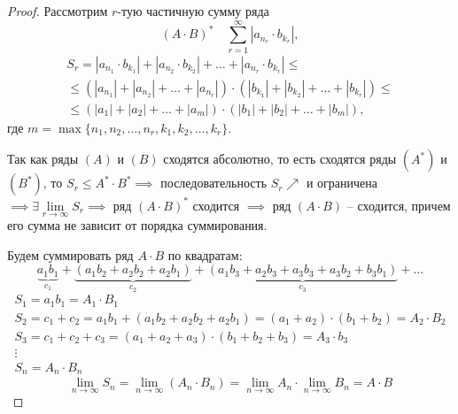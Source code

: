 \begin{proof}
    Рассмотрим $r$-тую частичную сумму ряда
    \[
        (A\cdot B)^* \quad \sum_{r=1}^{\infty}|a_{n_r}\cdot b_{k_r}|,
    \]
    \begin{multline*}
        S_r = |a_{n_1} \cdot b_{k_1}| + |a_{n_2} \cdot b_{k_2}| + \ldots + |a_{n_r} \cdot b_{k_r}| \leqslant \\
        \leqslant (|a_{n_1}| + |a_{n_2}| + \ldots + |a_{n_r}|) \cdot (|b_{k_1}| + |b_{k_2}| + \ldots + |b_{k_r}|) \leqslant \\
        \leqslant (|a_1| + |a_2| + \ldots + |a_m|) \cdot (|b_1| + |b_2| + \ldots + |b_m|),
    \end{multline*}
    где $m = \max\{n_1,n_2,\ldots,n_r,k_1,k_2,\ldots,k_r\}$.

    Так как ряды $(A)$ и $(B)$ сходятся абсолютно, то есть сходятся ряды $(A^*)$ и $(B^*)$, то $S_r \leqslant A^* \cdot B^* \implies$ последовательность $S_r \nearrow$ и ограничена $\implies \exists \underset{r\rightarrow\infty}{\lim} S_r \implies$ ряд $(A\cdot B)^*$ сходится $\implies$ ряд $ (A\cdot B) $ -- сходится, причем его сумма не зависит от порядка суммирования.

    Будем суммировать ряд $A\cdot B$ по квадратам:
    \[
        \underbrace{a_1b_1}_{c_1} + \underbrace{(a_1b_2 + a_2 b_2 + a_2 b_1)}_{c_2} + \underbrace{(a_1b_3 + a_2b_3 + a_3b_3 + a_3b_2 + b_3b_1)}_{c_3} + \ldots
    \]
    \[
        \begin{array}{l}
            S_1 = a_1b_1 = A_1\cdot B_1                                                                        \\
            S_2 = c_1 + c_2 = a_1b_1 + (a_1b_2 + a_2b_2 + a_2b_1) = (a_1 + a_2)\cdot(b_1 + b_2) = A_2\cdot B_2 \\
            S_3 = c_1 + c_2 + c_3 = (a_1 + a_2 + a_3)\cdot(b_1 + b_2 + b_3) = A_3\cdot b_3                     \\
            \vdots                                                                                             \\
            S_n = A_n \cdot B_n
        \end{array}
    \]
    \[
        \underset{n\rightarrow\infty}{\lim}S_n = \underset{n\rightarrow\infty}{\lim}(A_n \cdot B_n) = \underset{n\rightarrow\infty}{\lim}A_n \cdot \underset{n\rightarrow\infty}{\lim}B_n = A\cdot B
    \]
\end{proof}

\newpage